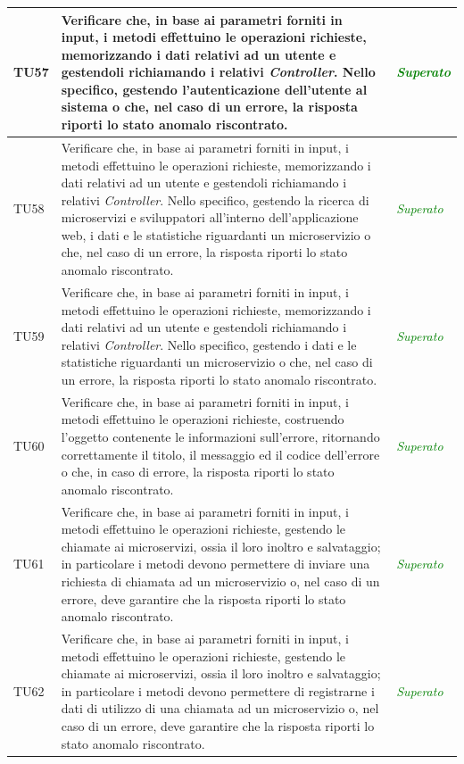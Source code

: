 \begin{longtable}{|>{\centering\arraybackslash}p{1.5cm}|>{\centering\arraybackslash}p{8cm} | >{\centering\arraybackslash}p{3.8cm}|}
		\hypertarget{TU57}{TU57} & Verificare che, in base ai parametri forniti in input, i metodi effettuino le operazioni richieste, memorizzando i dati relativi ad un utente e gestendoli richiamando i relativi \textit{Controller}. Nello specifico, gestendo l'autenticazione dell'utente al sistema o che, nel caso di un errore, la risposta riporti lo stato anomalo riscontrato. & \textcolor{Green}{\textit{Superato}}\\ \hline
		\hypertarget{TU58}{TU58} & Verificare che, in base ai parametri forniti in input, i metodi effettuino le operazioni richieste, memorizzando i dati relativi ad un utente e gestendoli richiamando i relativi \textit{Controller}. Nello specifico, gestendo la ricerca di microservizi e sviluppatori all'interno dell'applicazione web, i dati e le statistiche riguardanti un microservizio o che, nel caso di un errore, la risposta riporti lo stato anomalo riscontrato. & \textcolor{Green}{\textit{Superato}}\\ \hline
		\hypertarget{TU59}{TU59} & Verificare che, in base ai parametri forniti in input, i metodi effettuino le operazioni richieste, memorizzando i dati relativi ad un utente e gestendoli richiamando i relativi \textit{Controller}. Nello specifico, gestendo i dati e le statistiche riguardanti un microservizio o che, nel caso di un errore, la risposta riporti lo stato anomalo riscontrato. & \textcolor{Green}{\textit{Superato}}\\ \hline
		\hypertarget{TU60}{TU60} & Verificare che, in base ai parametri forniti in input, i metodi effettuino le operazioni richieste, costruendo l’oggetto contenente le informazioni sull'errore, ritornando correttamente il titolo, il messaggio ed il codice dell’errore o che, in caso di errore, la risposta riporti lo stato anomalo riscontrato. & \textcolor{Green}{\textit{Superato}}\\ \hline
		\hypertarget{TU61}{TU61} & Verificare che, in base ai parametri forniti in input, i metodi effettuino le operazioni richieste, gestendo le chiamate ai microservizi, ossia il loro inoltro e salvataggio; in particolare i metodi devono permettere di inviare una richiesta di chiamata ad un microservizio o, nel caso di un errore, deve garantire che la risposta riporti lo stato anomalo riscontrato. & \textcolor{Green}{\textit{Superato}}\\ \hline
		\hypertarget{TU62}{TU62} & Verificare che, in base ai parametri forniti in input, i metodi effettuino le operazioni richieste, gestendo le chiamate ai microservizi, ossia il loro inoltro e salvataggio; in particolare i metodi devono permettere di registrarne i dati di utilizzo di una chiamata ad un microservizio o, nel caso di un errore, deve garantire che la risposta riporti lo stato anomalo riscontrato. & \textcolor{Green}{\textit{Superato}}\\ \hline

\end{longtable}
